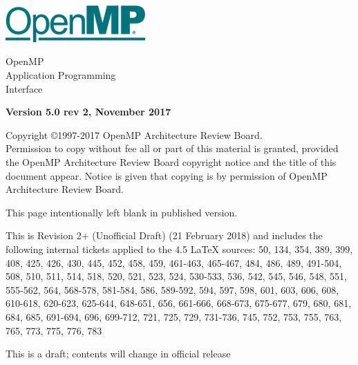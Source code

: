 
  \begin{titlepage}
    \begin{flushleft}
     \hspace{-6em} \includegraphics[width=0.4\textwidth]{openmp-logo.png}
    \end{flushleft}

    \begin{adjustwidth}{-0.75in}{0in}
    \begin{center}
      \Huge
      \textsf{OpenMP\\Application Programming\\Interface}

      \vspace{0.5in}\textsf{    }\vspace{-0.7in}
      \normalsize

      \vspace{1.0in}

      \textbf{Version 5.0 rev 2, November 2017}
    \end{center}
    \end{adjustwidth}

    \vspace{3.0in}

\begin{adjustwidth}{0pt}{1em}\setlength{\parskip}{0.25\baselineskip}%
Copyright \copyright 1997-2017 OpenMP Architecture Review Board.\\
Permission to copy without fee all or part of this material is granted,
provided the OpenMP Architecture Review Board copyright notice and
the title of this document appear. Notice is given that copying is by
permission of OpenMP Architecture Review Board.\end{adjustwidth}

  \end{titlepage}


\clearpage
\thispagestyle{empty}
\phantom{a}
This page intentionally left blank in published version.

This is Revision 2+ (Unofficial Draft) (21 February 2018) and
includes the following internal tickets applied to the 4.5 LaTeX sources:
50, 134, 354, 389, 399, 408, 425, 426, 430, 445, 452, 458, 459, 461-463, 
465-467, 484, 486, 489, 491-504, 508, 510, 511, 514, 518, 520, 521, 523, 
524, 530-533, 536, 542, 545, 546, 548, 551, 555-562, 564, 568-578, 581-584, 
586, 589-592, 594, 597, 598, 601, 603, 606, 608, 610-618, 620-623, 625-644, 
648-651, 656, 661-666, 668-673, 675-677, 679, 680, 681, 684, 685, 691-694, 
696, 699-712, 721, 725, 729, 731-736, 745, 752, 753, 755, 763, 765, 773, 
775, 776, 783

This is a draft; contents will change in official release

\vfill

